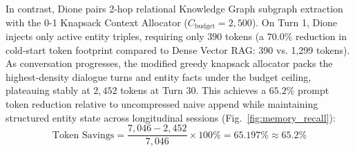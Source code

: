 \documentclass[conference,a4paper]{IEEEtran}
\begin{document}
In contrast, Dione pairs 2-hop relational Knowledge Graph subgraph extraction with the 0-1 Knapsack Context Allocator ($C_{\text{budget}} = 2{,}500$). On Turn 1, Dione injects only active entity triples, requiring only $390$ tokens (a $70.0\%$ reduction in cold-start token footprint compared to Dense Vector RAG: 390 vs. 1,299 tokens). As conversation progresses, the modified greedy knapsack allocator packs the highest-density dialogue turns and entity facts under the budget ceiling, plateauing stably at $2{,}452$ tokens at Turn 30. This achieves a $65.2\%$ prompt token reduction relative to uncompressed naive append while maintaining structured entity state across longitudinal sessions (Fig.~\ref{fig:memory_recall}):
\begin{equation}
\text{Token Savings} = \frac{7{,}046 - 2{,}452}{7{,}046} \times 100\% = 65.197\% \approx 65.2\%
\end{equation}
\end{document}
